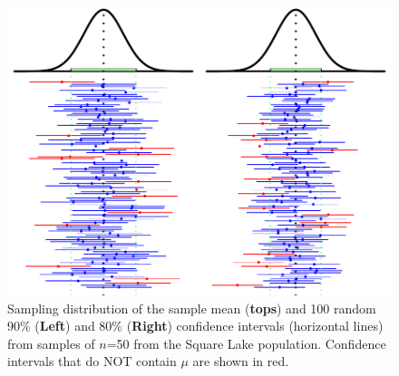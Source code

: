 \documentclass[10pt,openany]{book}\usepackage[]{graphicx}\usepackage[]{color}
\newenvironment{knitrout}{}{} %
\begin{document}
\begin{knitrout}
\color{fgcolor}\begin{figure}[hbtp]

{\centering \includegraphics[width=.92\linewidth]{Figs/CI9080Ex-1} 

}

\caption[Sampling distribution of the sample mean (\textbf{tops}) and 100 random 90\% (\textbf{Left}) and 80\% (\textbf{Right}) confidence intervals (horizontal lines) from samples of $n$=50 from the Square Lake population]{Sampling distribution of the sample mean (\textbf{tops}) and 100 random 90\% (\textbf{Left}) and 80\% (\textbf{Right}) confidence intervals (horizontal lines) from samples of $n$=50 from the Square Lake population.  Confidence intervals that do NOT contain $\mu$ are shown in red.}\label{fig:CI9080Ex}
\end{figure}


\end{knitrout}
\end{document}
